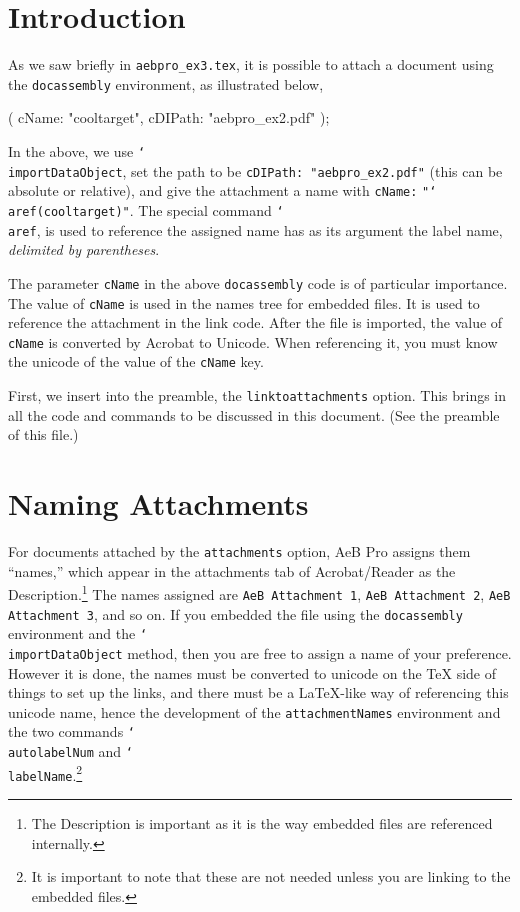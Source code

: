 \documentclass{article}
\newcommand{\cs}[1]{\texttt{\char`\\#1}}
\def\aftersverbskip{\noindent}
\newenvironment{sverbatim}
{\par\small\verbatim}
{\endverbatim\par\aftergroup\aftersverbskip}
\begin{document}
\maketitle

\tableofcontents

\section{Introduction}

As we saw briefly in \texttt{aebpro\_ex3.tex}, it is possible to
attach a document using the \texttt{docassembly} environment, as
illustrated below,
\begin{sverbatim}
    \begin{docassembly}
    \importDataObject({
        cName: "cooltarget",
        cDIPath: "aebpro_ex2.pdf"
    });
    \end{docassembly}
\end{sverbatim}
In the above, we use \cs{importDataObject}, set the path to be
\texttt{cDIPath: "aebpro\_ex2.pdf"} (this can be absolute or
relative), and give the attachment a name with \texttt{cName:}
\texttt{"\cs{aref(cooltarget)}"}. The special command \cs{aref}, is
used to reference the assigned name has as its argument the label
name, \emph{delimited by parentheses}.

The parameter \texttt{cName} in the above \texttt{docassembly} code
is of particular importance. The value of \texttt{cName} is used in
the names tree for embedded files. It is used to reference the
attachment in the link code.  After the file is imported, the value
of \texttt{cName} is converted by Acrobat to Unicode. When
referencing it, you must know the unicode of the value of the
\texttt{cName} key.

First, we insert into the preamble, the \texttt{linktoattachments} option.
This brings in all the code and commands to be discussed in this document.
(See the preamble of this file.)

\section{Naming Attachments}

For documents attached by the \texttt{attachments} option, AeB Pro
assigns them ``names,'' which appear in the attachments tab of
Acrobat/Reader as the Description.\footnote{The Description is
important as it is the way embedded files are referenced
internally.} The names assigned are \texttt{AeB Attachment 1},
\texttt{AeB Attachment 2}, \texttt{AeB Attachment 3}, and so on.
If you embedded the file using the \texttt{docassem\-bly} environment
and the \cs{importDataObject} method, then you are free to assign a
name of your preference. However it is done, the names must be
converted to unicode on the {\TeX} side of things to set up the
links, and there must be a \LaTeX-like way of referencing this
unicode name, hence the development of the \texttt{attachmentNames}
environment and the two commands \cs{autolabelNum} and
\cs{labelName}.\footnote{It is important to note that
these are not needed unless you are linking to the embedded
files.}
\end{document}
